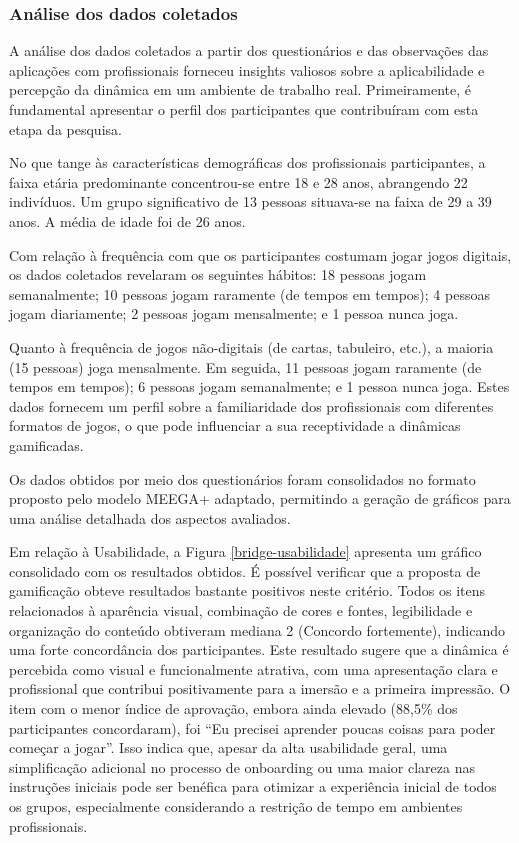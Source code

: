 \documentclass[
	12pt,
	openright,
	twoside,
	a4paper,
	english,
	brazil
	]{abntex2}
\begin{document}
\subsubsection{Análise dos dados coletados}

A análise dos dados coletados a partir dos questionários e das observações das aplicações com profissionais forneceu insights valiosos sobre a aplicabilidade e percepção da dinâmica em um ambiente de trabalho real. Primeiramente, é fundamental apresentar o perfil dos participantes que contribuíram com esta etapa da pesquisa.

No que tange às características demográficas dos profissionais participantes, a faixa etária predominante concentrou-se entre 18 e 28 anos, abrangendo 22 indivíduos. Um grupo significativo de 13 pessoas situava-se na faixa de 29 a 39 anos. A média de idade foi de 26 anos.

Com relação à frequência com que os participantes costumam jogar jogos digitais, os dados coletados revelaram os seguintes hábitos: 18 pessoas jogam semanalmente; 10 pessoas jogam raramente (de tempos em tempos); 4 pessoas jogam diariamente; 2 pessoas jogam mensalmente; e 1 pessoa nunca joga.

Quanto à frequência de jogos não-digitais (de cartas, tabuleiro, etc.), a maioria (15 pessoas) joga mensalmente. Em seguida, 11 pessoas jogam raramente (de tempos em tempos); 6 pessoas jogam semanalmente; e 1 pessoa nunca joga. Estes dados fornecem um perfil sobre a familiaridade dos profissionais com diferentes formatos de jogos, o que pode influenciar a sua receptividade a dinâmicas gamificadas.

Os dados obtidos por meio dos questionários foram consolidados no formato proposto pelo modelo MEEGA+ adaptado, permitindo a geração de gráficos para uma análise detalhada dos aspectos avaliados.

Em relação à Usabilidade, a Figura \ref{bridge-usabilidade} apresenta um gráfico consolidado com os resultados obtidos. É possível verificar que a proposta de gamificação obteve resultados bastante positivos neste critério. Todos os itens relacionados à aparência visual, combinação de cores e fontes, legibilidade e organização do conteúdo obtiveram mediana 2 (Concordo fortemente), indicando uma forte concordância dos participantes. Este resultado sugere que a dinâmica é percebida como visual e funcionalmente atrativa, com uma apresentação clara e profissional que contribui positivamente para a imersão e a primeira impressão. O item com o menor índice de aprovação, embora ainda elevado (88,5\% dos participantes concordaram), foi  “Eu precisei aprender poucas coisas para poder começar a jogar”. Isso indica que, apesar da alta usabilidade geral, uma simplificação adicional no processo de onboarding ou uma maior clareza nas instruções iniciais pode ser benéfica para otimizar a experiência inicial de todos os grupos, especialmente considerando a restrição de tempo em ambientes profissionais.
\end{document}
